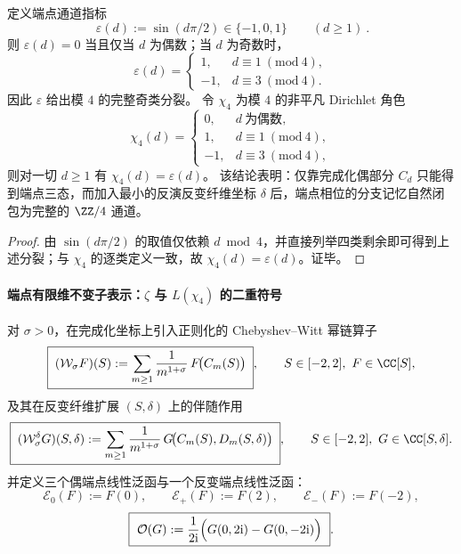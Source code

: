 \begin{theorem}\label{thm:endpoint-four-channel-chi4}
定义端点通道指标
\begin{equation}\label{eq:endpoint-epsilon-def}
\boxed{\ \varepsilon(d):=\sin(d\pi/2)\in\{-1,0,1\}\qquad(d\ge 1)\ }.
\end{equation}
则 \(\varepsilon(d)=0\) 当且仅当 \(d\) 为偶数；当 \(d\) 为奇数时，
\[
\varepsilon(d)=
\begin{cases}
1, & d\equiv 1\ (\mathrm{mod}\ 4),\\
-1,& d\equiv 3\ (\mathrm{mod}\ 4).
\end{cases}
\]
因此 \(\varepsilon\) 给出模 \(4\) 的完整奇类分裂。
令 \(\chi_{4}\) 为模 \(4\) 的非平凡 Dirichlet 角色
\[
\boxed{\;
\chi_{4}(d)=
\begin{cases}
0, & d\ \text{为偶数},\\
1, & d\equiv 1\ (\mathrm{mod}\ 4),\\
-1,& d\equiv 3\ (\mathrm{mod}\ 4),
\end{cases}\;}
\]
则对一切 \(d\ge 1\) 有 \(\chi_{4}(d)=\varepsilon(d)\)。
该结论表明：仅靠完成化偶部分 \(C_d\) 只能得到端点三态，而加入最小的反演反变纤维坐标 \(\delta\) 后，端点相位的分支记忆自然闭包为完整的 \(\ZZ/4\) 通道。
\end{theorem}
\begin{proof}
由 \(\sin(d\pi/2)\) 的取值仅依赖 \(d\bmod 4\)，并直接列举四类剩余即可得到上述分裂；与 \(\chi_4\) 的逐类定义一致，故 \(\chi_4(d)=\varepsilon(d)\)。证毕。
\end{proof}

\paragraph{端点有限维不变子表示：\texorpdfstring{$\zeta$}{zeta} 与 \texorpdfstring{$L(\chi_{4})$}{L(chi4)} 的二重符号}
对 \(\sigma>0\)，在完成化坐标上引入正则化的 Chebyshev--Witt 幂链算子
\begin{equation}\label{eq:endpoint-Wsigma-even}
\boxed{\;
(\mathcal W_{\sigma}F)(S):=\sum_{m\ge 1}\frac{1}{m^{1+\sigma}}\,F\!\bigl(C_m(S)\bigr)\; },
\qquad S\in[-2,2],\ F\in\CC[S],
\end{equation}
及其在反变纤维扩展 \((S,\delta)\) 上的伴随作用
\begin{equation}\label{eq:endpoint-Wsigma-odd}
\boxed{\;
(\mathcal W_{\sigma}^{\delta}G)(S,\delta):=\sum_{m\ge 1}\frac{1}{m^{1+\sigma}}\,G\!\bigl(C_m(S),D_m(S,\delta)\bigr)\; },
\qquad S\in[-2,2],\ G\in\CC[S,\delta].
\end{equation}
并定义三个偶端点线性泛函与一个反变端点线性泛函：
\[
\mathcal E_{0}(F):=F(0),\qquad \mathcal E_{+}(F):=F(2),\qquad \mathcal E_{-}(F):=F(-2),
\]
\begin{equation}\label{eq:endpoint-odd-functional-O}
\boxed{\ \mathcal O(G):=\frac{1}{2\mathrm{i}}\Bigl(G(0,2\mathrm{i})-G(0,-2\mathrm{i})\Bigr)\ }.
\end{equation}

